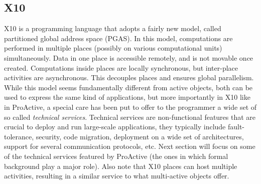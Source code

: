 \subsection{X10}
X10 \cite{charles2005x10} is a programming language that adopts a
fairly new model, called partitioned global address space (PGAS). In
this model, computations are performed in multiple places (possibly on
various computational units) simultaneously. Data in one place is
accessible remotely, and is not movable once created. Computations
inside places are locally synchronous, but inter-place activities are
asynchronous. This decouples places and ensures global parallelism.
While this model seems fundamentally different from active objects,
both can be used to express the same kind of applications, but more
importantly in X10 like in ProActive, a special care has been put to
offer to the programmer a wide set of so called \emph{technical
	services}. Technical services are non-functional features that are
crucial to deploy and run large-scale applications, they typically
include fault-tolerance, security, code migration, deployment on a
wide set of architectures, support for several communication
protocols, etc. Next section will focus on some of the technical
services featured by ProActive (the ones in which formal background
play a major role).  Also note that X10 places can host multiple
activities, resulting in a similar service to what
multi-active objects offer.
